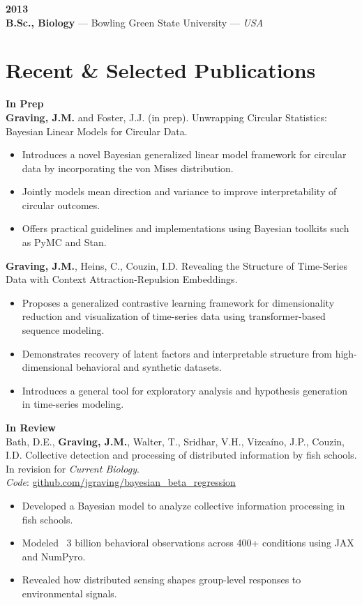 \documentclass[10pt,a4paper]{article}
\begin{document}
\textbf{2013} \\
\textbf{B.Sc., Biology} — Bowling Green State University — \textit{USA}





	
	\section*{Recent \& Selected Publications}
	\textbf{In Prep}\\
	\textbf{Graving, J.M.} and Foster, J.J. (in prep). Unwrapping Circular Statistics: Bayesian Linear Models for Circular Data.
	\begin{itemize}
		\item Introduces a novel Bayesian generalized linear model framework for circular data by incorporating the von Mises distribution.
		\item Jointly models mean direction and variance to improve interpretability of circular outcomes.
		\item Offers practical guidelines and implementations using Bayesian toolkits such as PyMC and Stan.
	\end{itemize}
	
	\textbf{Graving, J.M.}, Heins, C., Couzin, I.D. Revealing the Structure of Time-Series Data with Context Attraction-Repulsion Embeddings.
	\begin{itemize}
		\item Proposes a generalized contrastive learning framework for dimensionality reduction and visualization of time-series data using transformer-based sequence modeling.
		\item Demonstrates recovery of latent factors and interpretable structure from high-dimensional behavioral and synthetic datasets.
		\item Introduces a general tool for exploratory analysis and hypothesis generation in time-series modeling.
	\end{itemize}

	
	\vspace{4pt}
	\textbf{In Review}\\
	Bath, D.E., \textbf{Graving, J.M.}, Walter, T., Sridhar, V.H., Vizcaíno, J.P., Couzin, I.D. Collective detection and processing of distributed information by fish schools. In revision for \textit{Current Biology}. \\ \textit{Code}: \href{https://github.com/jgraving/bayesian_beta_regression}{github.com/jgraving/bayesian\_beta\_regression}
	\begin{itemize}
		\item Developed a Bayesian model to analyze collective information processing in fish schools.
		\item Modeled ~3 billion behavioral observations across 400+ conditions using JAX and NumPyro.
		\item Revealed how distributed sensing shapes group-level responses to environmental signals.
	\end{itemize}
	
\end{document}
